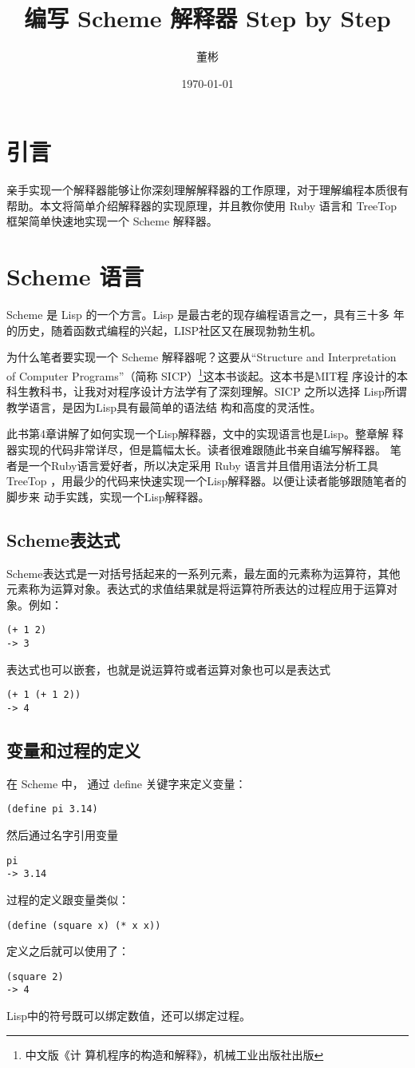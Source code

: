 \documentclass{article}
\title{编写 Scheme 解释器 Step by Step}
\author{董彬}
\date{\today}
\begin{document}
\maketitle

\section{引言}
亲手实现一个解释器能够让你深刻理解解释器的工作原理，对于理解编程本质很有帮助。本文将简单介绍解释器的实现原理，并且教你使用 Ruby
语言和 TreeTop 框架简单快速地实现一个 Scheme 解释器。

\section{Scheme 语言}
Scheme 是 Lisp 的一个方言。Lisp 是最古老的现存编程语言之一，具有三十多
年的历史，随着函数式编程的兴起，LISP社区又在展现勃勃生机。

为什么笔者要实现一个 Scheme 解释器呢？这要从“Structure and
Interpretation of Computer Programs”（简称 SICP）\footnote{中文版《计
  算机程序的构造和解释》，机械工业出版社出版}这本书谈起。这本书是MIT程
序设计的本科生教科书，让我对对程序设计方法学有了深刻理解。SICP 之所以选择 Lisp所谓教学语言，是因为Lisp具有最简单的语法结
构和高度的灵活性。

此书第4章讲解了如何实现一个Lisp解释器，文中的实现语言也是Lisp。整章解
释器实现的代码非常详尽，但是篇幅太长。读者很难跟随此书亲自编写解释器。
笔者是一个Ruby语言爱好者，所以决定采用 Ruby 语言并且借用语法分析工具 TreeTop
，用最少的代码来快速实现一个Lisp解释器。以便让读者能够跟随笔者的脚步来
动手实践，实现一个Lisp解释器。
\subsection{ Scheme表达式 }
Scheme表达式是一对括号括起来的一系列元素，最左面的元素称为运算符，其他
元素称为运算对象。表达式的求值结果就是将运算符所表达的过程应用于运算对
象。例如：
\begin{verbatim}
(+ 1 2)
-> 3
\end{verbatim}
表达式也可以嵌套，也就是说运算符或者运算对象也可以是表达式
\begin{verbatim}
(+ 1 (+ 1 2))
-> 4
\end{verbatim}
\subsection{变量和过程的定义}
在 Scheme 中， 通过 define 关键字来定义变量：
\begin{verbatim}
(define pi 3.14)
\end{verbatim}
然后通过名字引用变量
\begin{verbatim}
pi
-> 3.14
\end{verbatim}
过程的定义跟变量类似：
\begin{verbatim}
(define (square x) (* x x))
\end{verbatim}
定义之后就可以使用了：
\begin{verbatim}
(square 2)
-> 4
\end{verbatim}
Lisp中的符号既可以绑定数值，还可以绑定过程。
\end{document}
